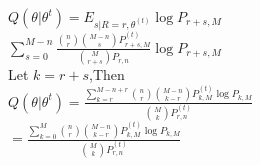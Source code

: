 \documentclass{article}\usepackage[]{graphicx}\usepackage[]{color}
\begin{document}
$Q(\theta | \theta^{t})=E_{s|R=r,\theta^{(t)}}\log P_{r+s,M}$\\

$\sum_{s=0}^{M-n}\frac{\binom{n}{r}\binom{M-n}{s}  P_{r+s,M}^{(t)}}{\binom{M}{r+s}  P_{r,n}}\log P_{r+s,M}$\\

Let $k=r+s$,Then \\

$Q(\theta | \theta^{t})=\frac{\sum_{k=r}^{M-n+r}\binom{n}{r}\binom{M-n}{k-r}P_{k,M}^{(t)}\log P_{k,M}}{\binom{M}{k}P_{r,n}^{(t)}}$\\



$=\frac{\sum_{k=0}^{M}\binom{n}{r}\binom{M-n}{k-r}P_{k,M}^{(t)}\log P_{k,M}}{\binom{M}{k}P_{r,n}^{(t)}}$\\
\end{document}
